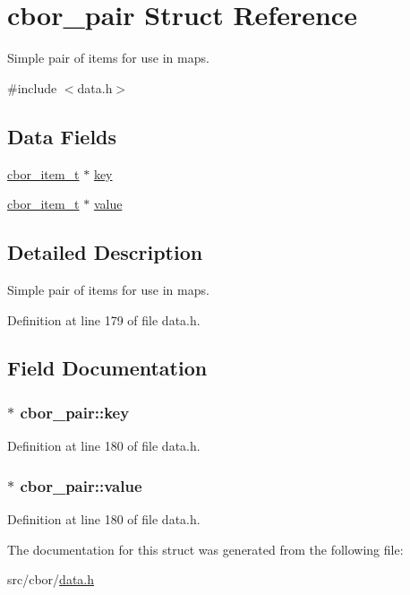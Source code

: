 \hypertarget{structcbor__pair}{\section{cbor\-\_\-pair Struct Reference}
\label{structcbor__pair}
}


Simple pair of items for use in maps.  




{\ttfamily \#include $<$data.\-h$>$}

\subsection*{Data Fields}
\begin{DoxyCompactItemize}
\item 
\hyperlink{structcbor__item__t}{cbor\-\_\-item\-\_\-t} $\ast$ \hyperlink{structcbor__pair_a5122c22ad7ef32b2c6ae0a413caca7a1}{key}
\item 
\hyperlink{structcbor__item__t}{cbor\-\_\-item\-\_\-t} $\ast$ \hyperlink{structcbor__pair_a44bbea9cc120de72fc4871a05dc8ec85}{value}
\end{DoxyCompactItemize}


\subsection{Detailed Description}
Simple pair of items for use in maps. 

Definition at line 179 of file data.\-h.



\subsection{Field Documentation}
\hypertarget{structcbor__pair_a5122c22ad7ef32b2c6ae0a413caca7a1}{
\subsubsection[{key}]{$\ast$ cbor\-\_\-pair\-::key}}\label{structcbor__pair_a5122c22ad7ef32b2c6ae0a413caca7a1}


Definition at line 180 of file data.\-h.

\hypertarget{structcbor__pair_a44bbea9cc120de72fc4871a05dc8ec85}{
\subsubsection[{value}]{ $\ast$ cbor\-\_\-pair\-::value}}\label{structcbor__pair_a44bbea9cc120de72fc4871a05dc8ec85}


Definition at line 180 of file data.\-h.



The documentation for this struct was generated from the following file\-:\begin{DoxyCompactItemize}
\item 
src/cbor/\hyperlink{data_8h}{data.\-h}\end{DoxyCompactItemize}

